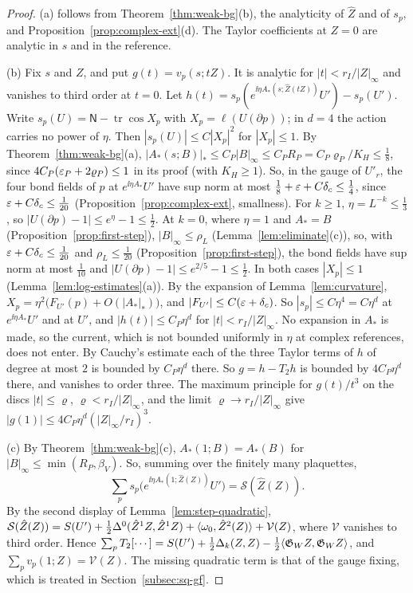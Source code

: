 \begin{proof}
(a) follows from Theorem~\ref{thm:weak-bg}(b), the analyticity of $\hat Z$ and of $s_p$, and Proposition~\ref{prop:complex-ext}(d). The Taylor coefficients at $Z=0$ are analytic in $s$ and in the reference.

(b) Fix $s$ and $Z$, and put $g(t)=v_p(s;tZ)$. It is analytic for $|t|<r_I/|Z|_\infty$ and vanishes to third order at $t=0$. Let $h(t)=s_p(e^{\ii\eta A_*(s;\hat Z(tZ))}U')-s_p(U')$. Write $s_p(U)=\mathsf N-\operatorname{tr}\cos X_p$ with $X_p=\ell(U(\partial p))$; in $d=4$ the action carries no power of $\eta$. Then $|s_p(U)|\le C|X_p|^2$ for $|X_p|\le1$. By Theorem~\ref{thm:weak-bg}(a), $|A_*(s;B)|_*\le C_P|B|_\infty\le C_PR_P=C_P\varrho_P/K_H\le\frac18$, since $4C_P(\varepsilon_P+2\varrho_P)\le1$ in its proof (with $K_H\ge1$). So, in the gauge of $U'_r$, the four bond fields of $p$ at $e^{\ii\eta A_*}U'$ have sup norm at most $\frac18+\varepsilon+C\delta_c\le\frac14$, since $\varepsilon+C\delta_c\le\frac1{20}$ (Proposition~\ref{prop:complex-ext}, smallness). For $k\ge1$, $\eta=L^{-k}\le\frac13$, so $|U(\partial p)-1|\le e^\eta-1\le\frac12$. At $k=0$, where $\eta=1$ and $A_*=B$ (Proposition~\ref{prop:first-step}), $|B|_\infty\le\rho_L$ (Lemma~\ref{lem:eliminate}(c)), so, with $\varepsilon+C\delta_c\le\frac1{20}$ and $\rho_L\le\frac1{20}$ (Proposition~\ref{prop:first-step}), the bond fields have sup norm at most $\frac1{10}$ and $|U(\partial p)-1|\le e^{2/5}-1\le\frac12$. In both cases $|X_p|\le1$ (Lemma~\ref{lem:log-estimates}(a)). By the expansion of Lemma~\ref{lem:curvature}, $X_p=\eta^2\big(F_{U'}(p)+O(|A_*|_*)\big)$, and $|F_{U'}|\le C(\varepsilon+\delta_c)$. So $|s_p|\le C\eta^4=C\eta^d$ at $e^{\ii\eta A_*}U'$ and at $U'$, and $|h(t)|\le C_P\eta^d$ for $|t|<r_I/|Z|_\infty$. No expansion in $A_*$ is made, so the current, which is not bounded uniformly in $\eta$ at complex references, does not enter. By Cauchy's estimate each of the three Taylor terms of $h$ of degree at most $2$ is bounded by $C_P\eta^d$ there. So $g=h-T_2h$ is bounded by $4C_P\eta^d$ there, and vanishes to order three. The maximum principle for $g(t)/t^3$ on the discs $|t|\le\varrho$, $\varrho<r_I/|Z|_\infty$, and the limit $\varrho\to r_I/|Z|_\infty$ give $|g(1)|\le4C_P\eta^d(|Z|_\infty/r_I)^3$.

(c) By Theorem~\ref{thm:weak-bg}(c), $A_*(1;B)=A_*(B)$ for $|B|_\infty\le\min(R_P,\beta_V)$. So, summing over the finitely many plaquettes,
\[
\sum_ps_p\big(e^{\ii\eta A_*(1;\hat Z(Z))}U'\big)=\mathcal S(\hat Z(Z)).
\] By the second display of Lemma~\ref{lem:step-quadratic}, $\mathcal S(\hat Z(Z))=S(U')+\frac12\Delta^0(\hat Z^1Z,\hat Z^1Z)+\langle \omega_0,\hat Z^2(Z)\rangle+\mathcal V(Z)$, where $\mathcal V$ vanishes to third order. Hence $\sum_pT_2[\cdots]=S(U')+\frac12\Delta_k(Z,Z)-\frac12\langle \mathfrak G_WZ,\mathfrak G_WZ\rangle$, and $\sum_pv_p(1;Z)=\mathcal V(Z)$. The missing quadratic term is that of the gauge fixing, which is treated in Section~\ref{subsec:sq-gf}.


\end{proof}
